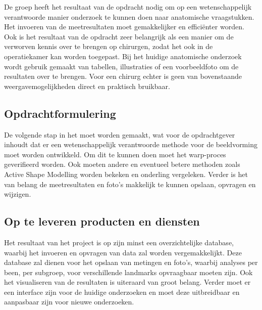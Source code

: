 De \casamproject groep heeft het resultaat van de opdracht nodig om op een wetenschappelijk verantwoorde manier onderzoek te kunnen doen naar anatomische vraagstukken. 
Het invoeren van de meetresultaten moet gemakkelijker en effici\"enter worden. 
Ook is het resultaat van de opdracht zeer belangrijk als een manier om de verworven kennis over te brengen op chirurgen, zodat het ook in de operatiekamer kan worden toegepast. 
Bij het huidige anatomische onderzoek wordt gebruik gemaakt van tabellen, illustraties of een voorbeeldfoto om de resultaten over te brengen. 
Voor een chirurg echter is geen van bovenstaande weergavemogelijkheden direct en praktisch bruikbaar.

\subsection{Opdrachtformulering}

De volgende stap in het \casamproject moet worden gemaakt, wat voor de opdrachtgever inhoudt dat er een wetenschappelijk verantwoorde methode voor de beeldvorming moet worden ontwikkeld. 
Om dit te kunnen doen moet het warp-proces geverifieerd worden. 
Ook moeten andere en eventueel betere methoden zoals Active Shape Modelling worden bekeken en onderling vergeleken. 
Verder is het van belang de meetresultaten en foto's makkelijk te kunnen opslaan, opvragen en wijzigen. 


\subsection{Op te leveren producten en diensten}

Het resultaat van het project is op zijn minst een overzichtelijke database, waarbij het invoeren en opvragen van data zal worden vergemakkelijkt.
Deze database zal dienen voor het opslaan van metingen en foto's, waarbij analyses per been, per subgroep, voor verschillende landmarks opvraagbaar moeten zijn.
Ook het visualiseren van de resultaten is uiteraard van groot belang.
Verder moet er een interface zijn voor de huidige onderzoeken en moet deze uitbreidbaar en aanpasbaar zijn voor nieuwe onderzoeken. 

